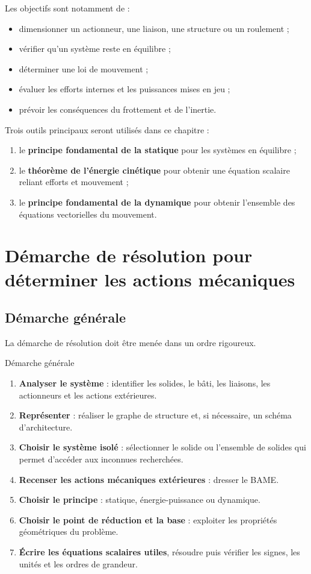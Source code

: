 Les objectifs sont notamment de :
\begin{itemize}
  \item dimensionner un actionneur, une liaison, une structure ou un roulement ;
  \item vérifier qu'un système reste en équilibre ;
  \item déterminer une loi de mouvement ;
  \item évaluer les efforts internes et les puissances mises en jeu ;
  \item prévoir les conséquences du frottement et de l'inertie.
\end{itemize}

Trois outils principaux seront utilisés dans ce chapitre :
\begin{enumerate}
  \item le \textbf{principe fondamental de la statique} pour les systèmes en équilibre ;
  \item le \textbf{théorème de l'énergie cinétique} pour obtenir une équation scalaire reliant efforts et mouvement ;
  \item le \textbf{principe fondamental de la dynamique} pour obtenir l'ensemble des équations vectorielles du mouvement.
\end{enumerate}

\section{Démarche de résolution pour déterminer les actions mécaniques}

\subsection{Démarche générale}

La démarche de résolution doit être menée dans un ordre rigoureux.

\begin{TLMethod}{Démarche générale}
\begin{enumerate}
  \item \textbf{Analyser le système} : identifier les solides, le bâti, les liaisons, les actionneurs et les actions extérieures.
  \item \textbf{Représenter} : réaliser le graphe de structure et, si nécessaire, un schéma d'architecture.
  \item \textbf{Choisir le système isolé} : sélectionner le solide ou l'ensemble de solides qui permet d'accéder aux inconnues recherchées.
  \item \textbf{Recenser les actions mécaniques extérieures} : dresser le BAME.
  \item \textbf{Choisir le principe} : statique, énergie-puissance ou dynamique.
  \item \textbf{Choisir le point de réduction et la base} : exploiter les propriétés géométriques du problème.
  \item \textbf{Écrire les équations scalaires utiles}, résoudre puis vérifier les signes, les unités et les ordres de grandeur.
\end{enumerate}
\end{TLMethod}

